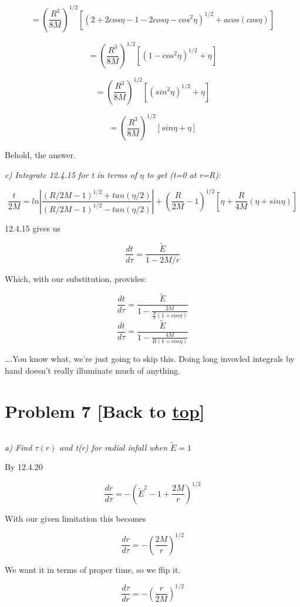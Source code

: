 \documentclass[landscape,letterpaper,10pt,english]{article}
\begin{document}
\[ = \left( \frac{R^3}{8M} \right)^{1/2} \left[ \left( 2+2cos\eta - 1  -2cos\eta -  cos^2\eta \right)^{1/2} + acos \left(cos\eta\right) \right] \]

\[ = \left( \frac{R^3}{8M} \right)^{1/2} \left[ \left(1 - cos^2\eta \right)^{1/2} + \eta \right] \]

\[ = \left( \frac{R^3}{8M} \right)^{1/2} \left[ (sin^2\eta)^{1/2} + \eta \right] \]

\[ = \left( \frac{R^3}{8M} \right)^{1/2} \left[ sin\eta + \eta \right] \]

Behold, the answer.

    \emph{c) Integrate 12.4.15 for t in terms of \(\eta\) to get (t=0 at
r=R):}

\[ \frac{t}{2M} = ln\left| \frac{(R/2M - 1)^{1/2}+tan(\eta/2)}{(R/2M - 1)^{1/2}-tan(\eta/2)} \right| + \left( \frac{R}{2M}-1 \right)^{1/2}\left[ \eta + \frac{R}{4M}(\eta+sin\eta)\right]\]

    12.4.15 gives us

\[ \frac{dt}{d\tau} = \frac{\tilde E}{1-2M/r} \]

Which, with our substitution, provides:

\[ \frac{dt}{d\tau} = \frac{\tilde E}{1-\frac{2M}{\frac{R}{2}(1+cos\eta)}} \]
\[ \frac{dt}{d\tau} = \frac{\tilde E}{1-\frac{4M}{R(1+cos\eta)}} \]

\ldots.You know what, we're just going to skip this. Doing long invovled
integrals by hand doesn't really illuminate much of anything.

    \hypertarget{problem-7-back-to-top}{%
\section{\texorpdfstring{Problem 7 {[}Back to
\hyperref[toc]{top}{]}}{Problem 7 {[}Back to {]}}}\label{problem-7-back-to-top}}

\[\label{P7}\]

\emph{a) Find \(\tau(r)\) and t(r) for radial infall when
\(\tilde E = 1\)}

    By 12.4.20

\[ \frac{dr}{d\tau} = -\left( \tilde E^2 - 1 + \frac{2M}{r} \right)^{1/2} \]

With our given limitation this becomes

\[ \frac{dr}{d\tau} = -\left( \frac{2M}{r} \right)^{1/2} \]

We want it in terms of proper time, so we flip it.

\[ \frac{d\tau}{d r} = -\left( \frac{r}{2M} \right)^{1/2} \]
\end{document}
